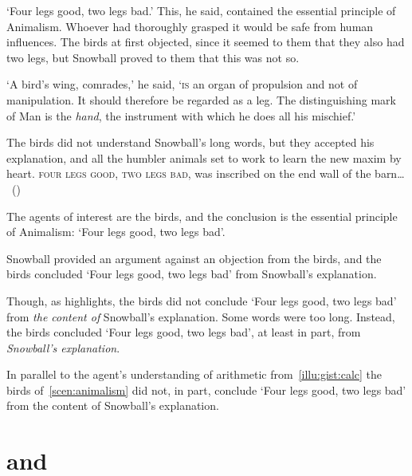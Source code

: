 \begin{note}
  \begin{scenario}[Animalism]
    \label{scen:animalism}
    `Four legs good, two legs bad.'
    This, he said, contained the essential principle of Animalism.
    Whoever had thoroughly grasped it would be safe from human influences.
    The birds at first objected, since it seemed to them that they also had two legs, but Snowball proved to them that this was not so.

    `A bird's wing, comrades,' he said, `\textsc{is} an organ of propulsion and not of manipulation.
    It should therefore be regarded as a leg.
    The distinguishing mark of Man is the \emph{hand}, the instrument with which he does all his mischief.'

    The birds did not understand Snowball's long words, but they accepted his explanation, and all the humbler animals set to work to learn the new maxim by heart.
    \textsc{four legs good, two legs bad}, was inscribed on the end wall of the barn\dots%
    \mbox{ }\hfill\mbox{(\cite[25]{Orwell:1976aa})}%
    \newline
  \end{scenario}

  The agents of interest are the birds, and the conclusion is the essential principle of Animalism:
  `Four legs good, two legs bad'.

  Snowball provided an argument against an objection from the birds, and the birds concluded `Four legs good, two legs bad' from Snowball's explanation.

  Though, as \citeauthor{Orwell:1976aa} highlights, the birds did not conclude `Four legs good, two legs bad' from \emph{the content of} Snowball's explanation.
  Some words were too long.
  Instead, the birds concluded `Four legs good, two legs bad', at least in part, from \emph{Snowball's explanation}.

  In parallel to the agent's understanding of arithmetic from~\autoref{illu:gist:calc} the birds of~\autoref{scen:animalism} did not, in part, conclude `Four legs good, two legs bad' from the content of Snowball's explanation.
\end{note}

\section*{\qWhy{} and \qHow{}}
\label{cha:intro:why-how}

